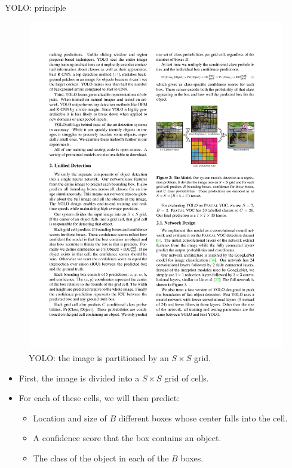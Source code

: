 \documentclass[xcolor=pdftex,dvipsnames,table]{beamer}
\begin{document}
\begin{frame}{YOLO: principle}
\begin{figure}[htb]
   \centering
   \includegraphics[height=0.4\textheight]{../graphics/YOLO_1.pdf}
   \caption{YOLO: the image is partitioned by an $S \times S$ grid.}
\end{figure}
\begin{itemize}
   \item First, the image is divided into a $S \times S$ grid of cells. 
   \item For each of these cells, we will then predict:
   \begin{itemize}
      \item Location and size of $B$ different boxes whose center falls into the cell. 
      \item A confidence score that the box contains an object. 
      \item The class of the object in each of the $B$ boxes. 
   \end{itemize}
\end{itemize}
\end{frame}
\end{document}

